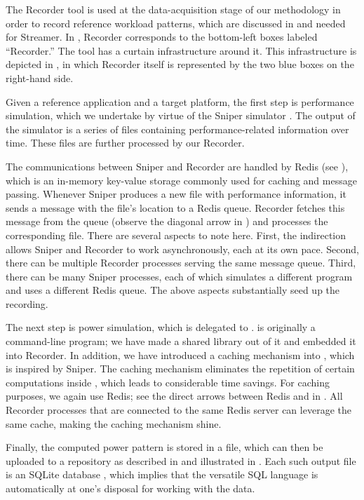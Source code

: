 
The Recorder tool is used at the data-acquisition stage of our methodology in
order to record reference workload patterns, which are discussed in
 and needed for Streamer. In , Recorder
corresponds to the bottom-left boxes labeled ``Recorder.'' The tool has a
curtain infrastructure around it. This infrastructure is depicted in
, in which Recorder itself is represented by the two blue boxes
on the right-hand side.

Given a reference application and a target platform, the first step is
performance simulation, which we undertake by virtue of the Sniper simulator
\cite{carlson2011}. The output of the simulator is a series of files containing
performance-related information over time. These files are further processed by
our Recorder.

The communications between Sniper and Recorder are handled by Redis \cite{redis}
(see ), which is an in-memory key-value storage commonly used for
caching and message passing. Whenever Sniper produces a new file with
performance information, it sends a message with the file's location to a Redis
queue. Recorder fetches this message from the queue (observe the diagonal arrow
in ) and processes the corresponding file. There are several
aspects to note here. First, the indirection allows Sniper and Recorder to work
asynchronously, each at its own pace. Second, there can be multiple Recorder
processes serving the same message queue. Third, there can be many Sniper
processes, each of which simulates a different program and uses a different
Redis queue. The above aspects substantially seed up the recording.

The next step is power simulation, which is delegated to 
\cite{li2009}.  is originally a command-line program; we have made a
shared library out of it and embedded it into Recorder. In addition, we have
introduced a caching mechanism into , which is inspired by Sniper. The
caching mechanism eliminates the repetition of certain computations inside
, which leads to considerable time savings. For caching purposes, we
again use Redis; see the direct arrows between Redis and  in
. All Recorder processes that are connected to the same Redis
server can leverage the same cache, making the caching mechanism shine.

Finally, the computed power pattern is stored in a file, which can then be
uploaded to a repository as described in  and illustrated in
. Each such output file is an SQLite database \cite{sqlite},
which implies that the versatile SQL language is automatically at one's disposal
for working with the data.
